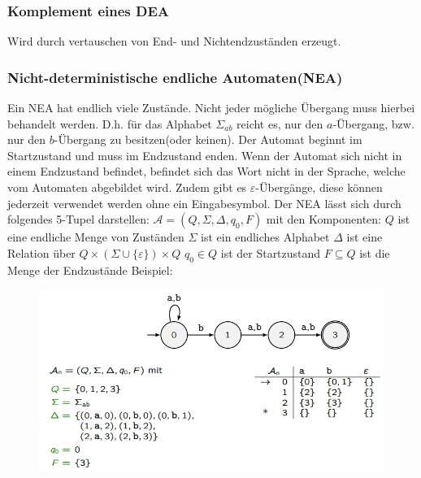 \documentclass[12pt,a4paper]{article}
\begin{document}
	\subsubsection{Komplement eines DEA}
	Wird durch vertauschen von End- und Nichtendzuständen erzeugt.

	\subsubsection{Nicht-deterministische endliche Automaten(NEA)}
	Ein NEA hat endlich viele Zustände. Nicht jeder mögliche Übergang muss hierbei behandelt werden. D.h. für das Alphabet $\varSigma_{ab}$ reicht es, nur den $a$-Übergang, bzw. nur den $b$-Übergang zu besitzen(oder keinen). Der Automat beginnt im Startzustand und muss im Endzustand enden. Wenn der Automat sich nicht in einem Endzustand befindet, befindet sich das Wort nicht in der Sprache, welche vom Automaten abgebildet wird. Zudem gibt es $\varepsilon$-Übergänge, diese können jederzeit verwendet werden ohne ein Eingabesymbol.\newline
	\noindent Der NEA lässt sich durch folgendes 5-Tupel darstellen:\newline
	$\mathcal{A} = (Q, \varSigma, \Delta , q_0, F)$ mit den Komponenten:\newline
	$Q$ ist eine endliche Menge von Zuständen\newline
	$\varSigma$ ist ein endliches Alphabet\newline
	$\Delta$ ist eine Relation über $Q \times (\varSigma \cup \{\varepsilon\}) \times Q$\newline
	$q_0 \in Q$ ist der Startzustand\newline
	$F \subseteq Q$ ist die Menge der Endzustände\newline
	\newline
	Beispiel:\newline
	\begin{center}
		\begin{figure}[!h]
			\includegraphics[width=\textwidth]{Bilder/NEA_Beispiel.png}
		\end{figure}
	\end{center}
\end{document}
